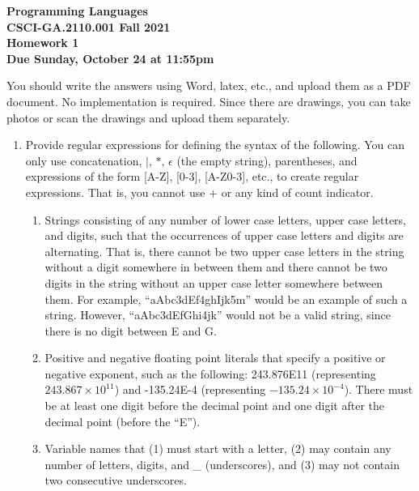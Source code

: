 \documentclass[11pt]{article}
\begin{document}
\begin{center}
{\bf
Programming Languages\\

CSCI-GA.2110.001 Fall 2021 \\
\vspace{2ex} 
Homework 1\\
Due Sunday, October 24 at 11:55pm}
\end{center}

\vspace{2ex}
\noindent
You should write the answers using Word, latex, etc., and upload them as a PDF document.  No implementation is required. Since there are drawings, you can take photos or scan the drawings and upload them separately.

\vspace{1ex}
\begin{enumerate} 
\item 
Provide regular expressions for defining the syntax of the following. You can only use concatenation, $|$, $*$, $\epsilon$ (the empty string), parentheses, and expressions of the form [A-Z], [0-3], [A-Z0-3], etc., to create regular expressions. That is, you cannot use $+$ or any kind of count indicator.

\begin{enumerate} 
\item 
Strings consisting of any number of lower case letters, upper case letters, and digits, such that the occurrences of upper case letters and digits are alternating.  That is, there cannot be two upper case letters in the string without a digit somewhere in between them and there cannot be two digits in the string without an upper case letter somewhere between them.  For example, ``aAbc3dEf4ghIjk5m'' would be an example of such a string. However, ``aAbc3dEfGhi4jk'' would not be a valid string, since there is no digit between E and G.


\item 
Positive and negative floating point literals that specify a positive or negative exponent, such as the following:  243.876E11 (representing $243.867 \times 10^{11}$) and -135.24E-4 (representing $-135.24 \times 10^{-4}$). There must be at least one digit before the decimal point and one digit after the decimal point (before the ``E'').

\item 
  Variable names that (1) must start with a letter, (2) may contain any number of letters, digits, and \_ (underscores), and (3) may not contain two consecutive underscores.


\end{enumerate}
\end{enumerate}
\end{document}
